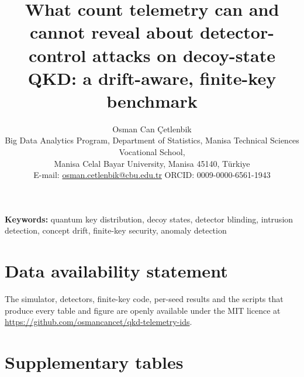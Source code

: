 \documentclass[11pt,a4paper]{article}
\title{What count telemetry can and cannot reveal about detector-control attacks on decoy-state QKD: a drift-aware, finite-key benchmark}
\author{Osman Can \c{C}etlenbik\\[2pt]
\small Big Data Analytics Program, Department of Statistics, Manisa Technical Sciences Vocational School,\\
\small Manisa Celal Bayar University, Manisa 45140, T\"urkiye\\
\small E-mail: \href{mailto:osman.cetlenbik@cbu.edu.tr}{osman.cetlenbik@cbu.edu.tr} \quad ORCID: 0009-0000-6561-1943}
\date{}
\begin{document}
\maketitle

\begin{abstract}

\end{abstract}

\noindent\textbf{Keywords:} quantum key distribution, decoy states, detector blinding, intrusion detection, concept drift, finite-key security, anomaly detection










\section*{Data availability statement}
The simulator, detectors, finite-key code, per-seed results and the scripts that produce every table and figure are openly available under the MIT licence at \url{https://github.com/osmancancet/qkd-telemetry-ids}.

\appendix
\section{Supplementary tables}
\begin{table}[h]
\centering
\caption{Per-window false-alarm rate (\%) with the other calibration set, the opposite of each detector's default: drift-free data for IF-drift, RF-DR and RF-res, drifting data for all others. Mean with 95\% BCa interval over \nSeeds{} seeds.}\label{tab:fprctrl}
\footnotesize\resizebox{\linewidth}{!}{}
\end{table}

\begin{table}[h]
\centering
\caption{Per-window false-alarm rate (\%) at $\alpha=1\%$, default calibration. Mean with 95\% BCa interval over \nSeeds{} seeds.}\label{tab:fpra2}
\footnotesize\resizebox{\linewidth}{!}{}
\end{table}

\begin{table}[h]
\centering
\caption{Per-window false-alarm rate (\%) at $\alpha=0.01\%$, default calibration. Mean with 95\% BCa interval over \nSeeds{} seeds.}\label{tab:fpra4}
\footnotesize\resizebox{\linewidth}{!}{}
\end{table}
\end{document}
